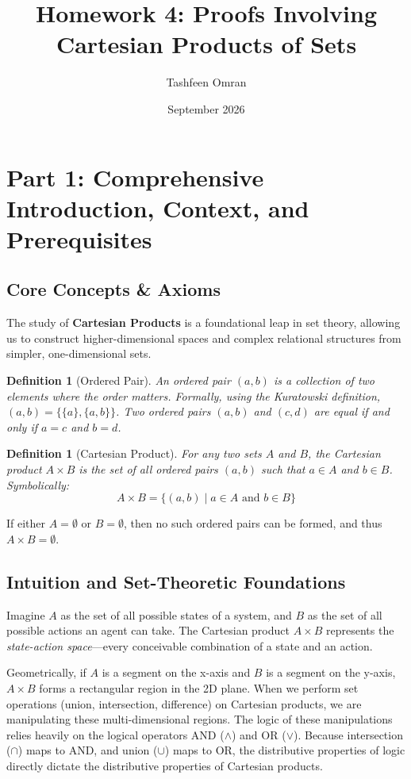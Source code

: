 \documentclass[11pt]{article}
\title{Homework 4: Proofs Involving Cartesian Products of Sets}
\author{Tashfeen Omran}
\date{September 2026}
\newtheorem{definition}[theorem]{Definition}
\begin{document}
\maketitle
\tableofcontents
\newpage

\section{Part 1: Comprehensive Introduction, Context, and Prerequisites}

\subsection{Core Concepts \& Axioms}
The study of \textbf{Cartesian Products} is a foundational leap in set theory, allowing us to construct higher-dimensional spaces and complex relational structures from simpler, one-dimensional sets. 

\begin{definition}[Ordered Pair]
An ordered pair $(a, b)$ is a collection of two elements where the order matters. Formally, using the Kuratowski definition, $(a, b) = \{\{a\}, \{a, b\}\}$. Two ordered pairs $(a, b)$ and $(c, d)$ are equal if and only if $a = c$ and $b = d$.
\end{definition}

\begin{definition}[Cartesian Product]
For any two sets $A$ and $B$, the Cartesian product $A \times B$ is the set of all ordered pairs $(a, b)$ such that $a \in A$ and $b \in B$. Symbolically:
\[ A \times B = \{ (a, b) \mid a \in A \text{ and } b \in B \} \]
\end{definition}

If either $A = \emptyset$ or $B = \emptyset$, then no such ordered pairs can be formed, and thus $A \times B = \emptyset$.

\subsection{Intuition and Set-Theoretic Foundations}
Imagine $A$ as the set of all possible states of a system, and $B$ as the set of all possible actions an agent can take. The Cartesian product $A \times B$ represents the \textit{state-action space}—every conceivable combination of a state and an action. 

Geometrically, if $A$ is a segment on the x-axis and $B$ is a segment on the y-axis, $A \times B$ forms a rectangular region in the 2D plane. When we perform set operations (union, intersection, difference) on Cartesian products, we are manipulating these multi-dimensional regions. The logic of these manipulations relies heavily on the logical operators AND ($\land$) and OR ($\lor$). Because intersection ($\cap$) maps to AND, and union ($\cup$) maps to OR, the distributive properties of logic directly dictate the distributive properties of Cartesian products.
\end{document}
